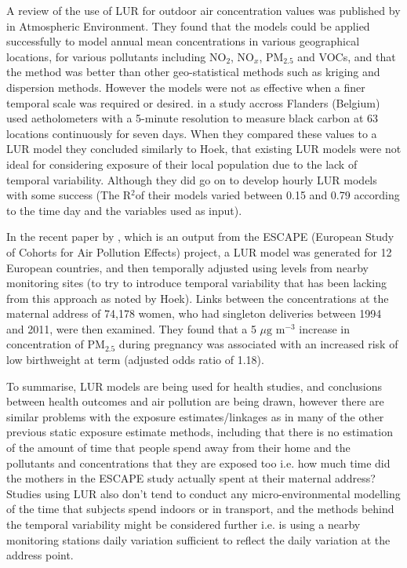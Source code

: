 A review of the use of LUR for outdoor air concentration values was published by \cite{Hoek2008} in Atmospheric Environment. They found that the models could be applied successfully to model annual mean concentrations in various geographical locations, for various pollutants including NO$_{2}$, NO$_{x}$, PM$_{2.5}$ and VOCs, and that the method was better than other geo-statistical methods such as kriging and dispersion methods. However the models were not as effective when a finer temporal scale was required or desired. \cite{Dons2013} in a study accross Flanders (Belgium) used aetholometers with a 5-minute resolution to measure black carbon at 63 locations continuously for seven days. When they compared these values to a LUR model they concluded similarly to Hoek, that existing LUR models were not ideal for considering exposure of their local population due to the lack of temporal variability. Although they did go on to develop hourly LUR models with some success (The R$^{2}$of their models varied between 0.15 and 0.79 according to the time day and the variables used as input).

In the recent paper by \cite{Pedersen2013}, which is an output from the ESCAPE (European Study of Cohorts for Air Pollution Effects) project, a LUR model was generated for 12 European countries, and then temporally adjusted using levels from nearby monitoring sites (to try to introduce temporal variability that has been lacking from this approach as noted by Hoek). Links between the concentrations at the maternal address of 74,178 women, who had singleton deliveries between 1994 and 2011, were then examined. They found that a 5 $\mu \text{g m}^{-3}$ increase in concentration of PM$_{2.5}$ during pregnancy was associated with an increased risk of low birthweight at term (adjusted odds ratio of 1.18).

To summarise, LUR models are being used for health studies, and conclusions between health outcomes and air pollution are being drawn, however there are similar problems with the exposure estimates\slash linkages as in many of the other previous static exposure estimate methods, including that there is no estimation of the amount of time that people spend away from their home and the pollutants and concentrations that they are exposed too i.e. how much time did the mothers in the ESCAPE study actually spent at their maternal address? Studies using LUR also don't tend to conduct any micro-environmental modelling of the time that subjects spend indoors or in transport, and the methods behind the temporal variability might be considered further i.e. is using a nearby monitoring stations daily variation sufficient to reflect the daily variation at the address point.

